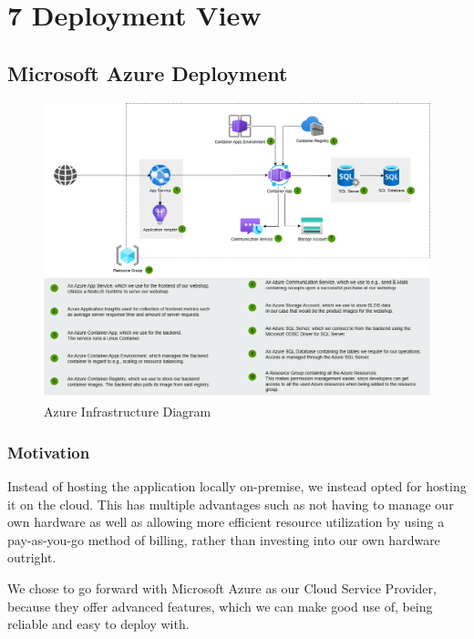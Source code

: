 \hypertarget{section-deployment-view}{%
\section{7 Deployment View}\label{section-deployment-view}}

\hypertarget{_infrastructure_level_1}{%
\subsection{Microsoft Azure Deployment}\label{_infrastructure_level_1}}

\begin{figure}[h]
  \centering
  \includegraphics[width=\textwidth]{images/azure_deployment_view.png}
  \caption{Azure Infrastructure Diagram}
\end{figure}

\subsubsection{Motivation}
Instead of hosting the application locally on-premise, we instead opted for hosting it on the cloud.
This has multiple advantages such as not having to manage our own hardware as well as allowing more efficient resource utilization
by using a pay-as-you-go method of billing, rather than investing into our own hardware outright.

We chose to go forward with Microsoft Azure as our Cloud Service Provider, because they offer advanced features,
which we can make good use of, 
being reliable and easy to deploy with.

